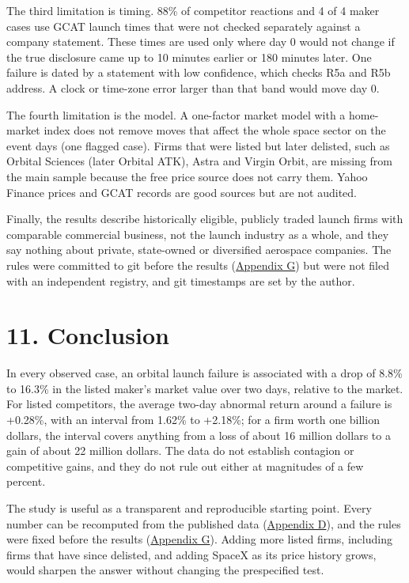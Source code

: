 \documentclass[12pt,a4paper]{article}
\begin{document}
The third limitation is timing. 88\% of competitor reactions and 4 of 4 maker cases use GCAT launch times that were not checked separately against a company statement. These times are used only where day 0 would not change if the true disclosure came up to 10 minutes earlier or 180 minutes later. One failure is dated by a statement with low confidence, which checks R5a and R5b address. A clock or time-zone error larger than that band would move day 0.

The fourth limitation is the model. A one-factor market model with a home-market index does not remove moves that affect the whole space sector on the event days (one flagged case). Firms that were listed but later delisted, such as Orbital Sciences (later Orbital ATK), Astra and Virgin Orbit, are missing from the main sample because the free price source does not carry them. Yahoo Finance prices and GCAT records are good sources but are not audited.

Finally, the results describe historically eligible, publicly traded launch firms with comparable commercial business, not the launch industry as a whole, and they say nothing about private, state-owned or diversified aerospace companies. The rules were committed to git before the results (\hyperlink{apx-g}{Appendix G}) but were not filed with an independent registry, and git timestamps are set by the author.

\section*{\hypertarget{s11}{}11. Conclusion}
In every observed case, an orbital launch failure is associated with a drop of 8.8\% to 16.3\% in the listed maker's market value over two days, relative to the market. For listed competitors, the average two-day abnormal return around a failure is +0.28\%, with an interval from \textminus{}1.62\% to +2.18\%; for a firm worth one billion dollars, the interval covers anything from a loss of about 16 million dollars to a gain of about 22 million dollars. The data do not establish contagion or competitive gains, and they do not rule out either at magnitudes of a few percent.

The study is useful as a transparent and reproducible starting point. Every number can be recomputed from the published data (\hyperlink{apx-d}{Appendix D}), and the rules were fixed before the results (\hyperlink{apx-g}{Appendix G}). Adding more listed firms, including firms that have since delisted, and adding SpaceX as its price history grows, would sharpen the answer without changing the prespecified test.
\end{document}
